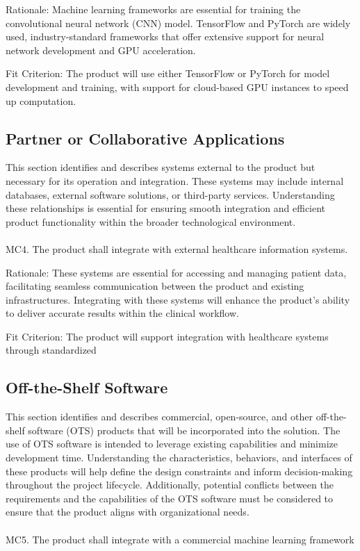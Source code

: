 \documentclass[12pt]{article}
\begin{document}
Rationale: Machine learning frameworks are essential for training the convolutional neural network 
(CNN) model. TensorFlow and PyTorch are widely used, industry-standard frameworks that offer 
extensive support for neural network development and GPU acceleration.

Fit Criterion: The product will use either TensorFlow or PyTorch for model development and 
training, with support for cloud-based GPU instances to speed up computation.

\subsection{Partner or Collaborative Applications}
This section identifies and describes systems external to the product but necessary for its 
operation and integration. These systems may include internal databases, external software 
solutions, or third-party services. Understanding these relationships is essential for ensuring 
smooth integration and efficient product functionality within the broader technological 
environment.
\\\\
\noindent
MC4. The product shall integrate with external healthcare information systems.

Rationale: These systems are essential for accessing and managing patient data, facilitating 
seamless communication between the product and existing infrastructures. Integrating with these 
systems will enhance the product's ability to deliver accurate results within the clinical 
workflow.

Fit Criterion: The product will support integration with healthcare systems through standardized

\subsection{Off-the-Shelf Software}
This section identifies and describes commercial, open-source, and other off-the-shelf software 
(OTS) products that will be incorporated into the solution. The use of OTS software is intended to 
leverage existing capabilities and minimize development time. Understanding the characteristics, 
behaviors, and interfaces of these products will help define the design constraints and inform 
decision-making throughout the project lifecycle. Additionally, potential conflicts between the 
requirements and the capabilities of the OTS software must be considered to ensure that the 
product aligns with organizational needs.
\\\\
\noindent
MC5. The product shall integrate with a commercial machine learning framework
\end{document}
